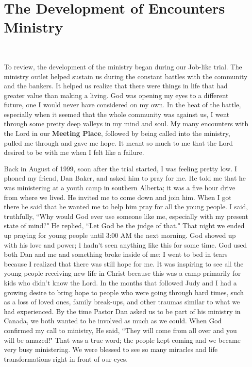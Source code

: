 \documentclass[oneside,12pt]{book}
\begin{document}
\chapter{The Development of Encounters Ministry}
\

To review, the development of the ministry began during our Job-like trial. The ministry outlet helped sustain us during the constant battles with the community and the bankers. It helped us realize that there were things in life that had greater value than making a living. God was opening my eyes to a different future, one I would never have considered on my own. In the heat of the battle, especially when it seemed that the whole community was against us, I went through some pretty deep valleys in my mind and soul. My many encounters with the Lord in our \textbf{Meeting Place}, followed by being called into the ministry, pulled me through and gave me hope. It meant so much to me that the Lord desired to be with me when I felt like a failure. 

Back in August of 1999, soon after the trial started, I was feeling pretty low. I phoned my friend, Dan Baker, and asked him to pray for me. He told me that he was ministering at a youth camp in southern Alberta; it was a five hour drive from where we lived. He invited me to come down and join him. When I got there he said that he wanted me to help him pray for all the young people. I said, truthfully, ``Why would God ever use someone like me, especially with my present state of mind?" He replied, ``Let God be the judge of that." That night we ended up praying for young people until 3:00 AM the next morning. God showed up with his love and power; I hadn't seen anything like this for some time. God used both Dan and me and something broke inside of me; I went to bed in tears because I realized that there was still hope for me. It was inspiring to see all the young people receiving new life in Christ because this was a camp primarily for kids who didn't know the Lord. In the months that followed Judy and I had a growing desire to bring hope to people who were going through hard times, such as a loss of loved ones, family break-ups, and other traumas similar to what we had experienced. By the time Pastor Dan asked us to be part of his ministry in Canada, we both wanted to be involved as much as we could. When God confirmed my call to ministry, He said, ``They will come from all over and you will be amazed!" That was a true word; the people kept coming and we became very busy ministering. We were blessed to see so many miracles and life transformations right in front of our eyes. 
\end{document}
